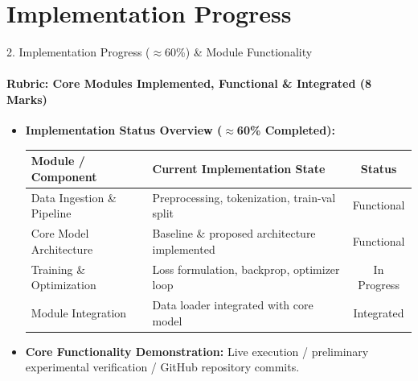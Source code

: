 \documentclass[aspectratio=169, 11pt]{beamer}
\begin{document}
\section{Implementation Progress}
\begin{frame}{2. Implementation Progress ($\approx$60\%) \& Module Functionality}
    \framesubtitle{Rubric: Core Modules Implemented, Functional \& Integrated (8 Marks)}
    \begin{itemize}
        \item \textbf{Implementation Status Overview ($\approx$60\% Completed):}
        \begin{table}
            \centering
            \footnotesize
            \renewcommand{\arraystretch}{1.1}
            \begin{tabular}{p{3.5cm} p{4.5cm} c}
                \toprule
                \textbf{Module / Component} & \textbf{Current Implementation State} & \textbf{Status} \\
                \midrule
                Data Ingestion \& Pipeline & Preprocessing, tokenization, train-val split & Functional \\
                Core Model Architecture & Baseline \& proposed architecture implemented & Functional \\
                Training \& Optimization & Loss formulation, backprop, optimizer loop & In Progress \\
                Module Integration & Data loader integrated with core model & Integrated \\
                \bottomrule
            \end{tabular}
        \end{table}
        \item \textbf{Core Functionality Demonstration:} Live execution / preliminary experimental verification / GitHub repository commits.
    \end{itemize}
\end{frame}

\end{document}
